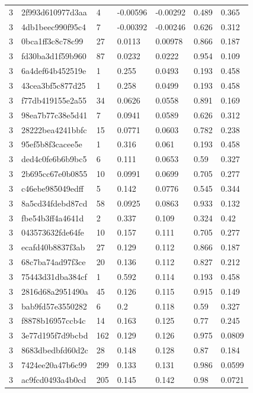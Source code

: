 \begin{tabular}{lllllll}
3 & 2f993d610977d3aa & 4 & -0.00596 & -0.00292 & 0.489 & 0.365 \\
3 & 4db1beec990f95c4 & 7 & -0.00392 & -0.00246 & 0.626 & 0.312 \\
3 & 0bca1ff3c8c78c99 & 27 & 0.0113 & 0.00978 & 0.866 & 0.187 \\
3 & fd30ba3d1f59b960 & 87 & 0.0232 & 0.0222 & 0.954 & 0.109 \\
3 & 6a4def64b452519e & 1 & 0.255 & 0.0493 & 0.193 & 0.458 \\
3 & 43cea3bf5c877d25 & 1 & 0.258 & 0.0499 & 0.193 & 0.458 \\
3 & f77db419155e2a55 & 34 & 0.0626 & 0.0558 & 0.891 & 0.169 \\
3 & 98ea7b77c38e5d41 & 7 & 0.0941 & 0.0589 & 0.626 & 0.312 \\
3 & 28222bea4241bbfc & 15 & 0.0771 & 0.0603 & 0.782 & 0.238 \\
3 & 95ef5b8f3cacee5e & 1 & 0.316 & 0.061 & 0.193 & 0.458 \\
3 & ded4c0fe6b6b9bc5 & 6 & 0.111 & 0.0653 & 0.59 & 0.327 \\
3 & 2b695cc67e0b0855 & 10 & 0.0991 & 0.0699 & 0.705 & 0.277 \\
3 & c46ebe985049edff & 5 & 0.142 & 0.0776 & 0.545 & 0.344 \\
3 & 8a5cd34fdebd87cd & 58 & 0.0925 & 0.0863 & 0.933 & 0.132 \\
3 & fbe54b3ff4a4641d & 2 & 0.337 & 0.109 & 0.324 & 0.42 \\
3 & 043573632fde64fe & 10 & 0.157 & 0.111 & 0.705 & 0.277 \\
3 & ecafd40b8837f3ab & 27 & 0.129 & 0.112 & 0.866 & 0.187 \\
3 & 68c7ba74ad97f3ce & 20 & 0.136 & 0.112 & 0.827 & 0.212 \\
3 & 75443d31dba384cf & 1 & 0.592 & 0.114 & 0.193 & 0.458 \\
3 & 2816d68a2951490a & 45 & 0.126 & 0.115 & 0.915 & 0.149 \\
3 & bab9fd57e3550282 & 6 & 0.2 & 0.118 & 0.59 & 0.327 \\
3 & f8878b16957ccb4c & 14 & 0.163 & 0.125 & 0.77 & 0.245 \\
3 & 3e77d195f7d9bcbd & 162 & 0.129 & 0.126 & 0.975 & 0.0809 \\
3 & 8683dbedbfd60d2c & 28 & 0.148 & 0.128 & 0.87 & 0.184 \\
3 & 7424ee20a47b6c99 & 299 & 0.133 & 0.131 & 0.986 & 0.0599 \\
3 & ac9fcd0493a4b0cd & 205 & 0.145 & 0.142 & 0.98 & 0.0721 \\

\end{tabular}
